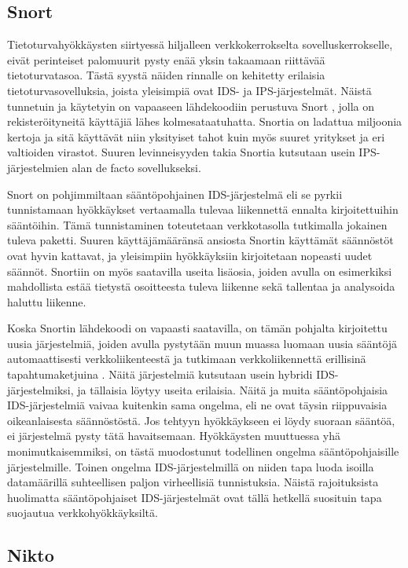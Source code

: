 \subsection{Snort}

Tietoturvahyökkäysten siirtyessä hiljalleen verkkokerrokselta sovelluskerrokselle, eivät perinteiset palomuurit pysty enää yksin takaamaan riittävää tietoturvatasoa. Tästä syystä näiden
rinnalle on kehitetty erilaisia tietoturvasovelluksia, joista yleisimpiä ovat IDS- ja IPS-järjestelmät. Näistä tunnetuin ja käytetyin on vapaaseen lähdekoodiin perustuva Snort \cite{Snort}, jolla 
on rekisteröityneitä käyttäjiä lähes kolmesataatuhatta. Snortia on ladattua miljoonia kertoja ja sitä käyttävät niin yksityiset tahot kuin myös suuret yritykset ja eri valtioiden virastot. Suuren
levinneisyyden takia Snortia kutsutaan usein IPS-järjestelmien alan de facto sovellukseksi.

Snort on pohjimmiltaan sääntöpohjainen IDS-järjestelmä eli se pyrkii tunnistamaan hyökkäykset vertaamalla tulevaa liikennettä ennalta kirjoitettuihin sääntöihin. Tämä tunnistaminen toteutetaan
verkkotasolla tutkimalla jokainen tuleva paketti. Suuren käyttäjämääränsä ansiosta Snortin käyttämät säännöstöt ovat hyvin kattavat, ja yleisimpiin hyökkäyksiin kirjoitetaan
nopeasti uudet säännöt. Snortiin on myös saatavilla useita lisäosia, joiden avulla on esimerkiksi mahdollista estää tietystä osoitteesta tuleva liikenne sekä tallentaa ja analysoida haluttu liikenne. 

Koska Snortin lähdekoodi on vapaasti saatavilla, on tämän pohjalta kirjoitettu uusia järjestelmiä, joiden avulla pystytään muun muassa luomaan uusia sääntöjä automaattisesti verkkoliikenteestä 
\cite{SnortRule} ja tutkimaan verkkoliikennettä erillisinä tapahtumaketjuina \cite{SnortSet}. Näitä järjestelmiä kutsutaan usein hybridi IDS-järjestelmiksi, ja tällaisia löytyy useita erilaisia. 
Näitä ja muita sääntöpohjaisia IDS-järjestelmiä vaivaa kuitenkin sama ongelma, eli ne ovat täysin riippuvaisia oikeanlaisesta säännöstöstä. Jos tehtyyn hyökkäykseen ei löydy suoraan sääntöä, 
ei järjestelmä pysty tätä havaitsemaan. Hyökkäysten muuttuessa yhä monimutkaisemmiksi, on tästä muodostunut todellinen ongelma sääntöpohjaisille järjestelmille. Toinen ongelma IDS-järjestelmillä
on niiden tapa luoda isoilla datamäärillä suhteellisen paljon virheellisiä tunnistuksia. Näistä rajoituksista huolimatta sääntöpohjaiset IDS-järjestelmät ovat tällä hetkellä suosituin tapa
suojautua verkkohyökkäyksiltä. 

\subsection{Nikto}

